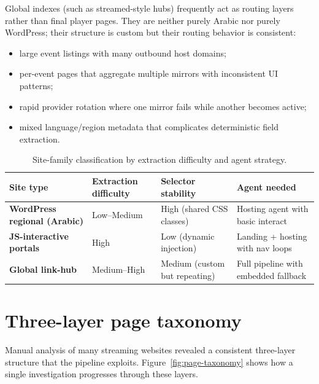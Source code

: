 Global indexes (such as streamed-style hubs) frequently act as routing layers rather
than final player pages. They are neither purely Arabic nor purely WordPress; their
structure is custom but their routing behavior is consistent:

\begin{itemize}
  \item large event listings with many outbound host domains;
  \item per-event pages that aggregate multiple mirrors with inconsistent UI patterns;
  \item rapid provider rotation where one mirror fails while another becomes active;
  \item mixed language/region metadata that complicates deterministic field extraction.
\end{itemize}

\begin{table}[H]
\centering
\begin{tabularx}{\textwidth}{>{\raggedright\arraybackslash\bfseries}p{3.2cm}
                              >{\raggedright\arraybackslash}X
                              >{\raggedright\arraybackslash}X
                              >{\raggedright\arraybackslash}X}
\toprule
\rowcolor{accent!8}
Site type & Extraction difficulty & Selector stability & Agent needed \\
\midrule
WordPress regional (Arabic) & Low--Medium & High (shared CSS classes) &
  Hosting agent with basic interact \\
JS-interactive portals & High & Low (dynamic injection) &
  Landing + hosting with nav loops \\
Global link-hub & Medium--High & Medium (custom but repeating) &
  Full pipeline with embedded fallback \\
\bottomrule
\end{tabularx}
\caption{Site-family classification by extraction difficulty and agent strategy.}
\label{tab:site-families}
\end{table}

\section{Three-layer page taxonomy}

Manual analysis of many streaming websites revealed a consistent three-layer structure
that the pipeline exploits. Figure~\ref{fig:page-taxonomy} shows how a single
investigation progresses through these layers.

